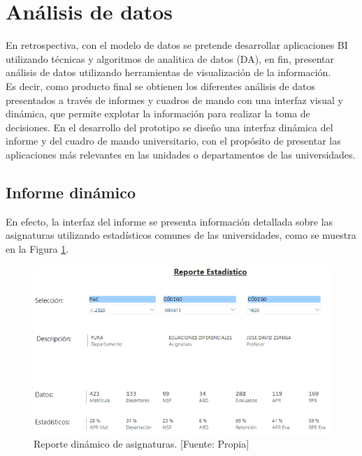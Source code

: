 \documentclass[11pt,titlepage]{report}
\begin{document}

\section{Análisis de datos}
En retrospectiva, con el modelo de datos se pretende desarrollar aplicaciones BI utilizando técnicas y algoritmos de analitica de datos (DA), en fin, presentar análisis de datos utilizando herramientas de visualización de la información.\\

Es decir, como producto final se obtienen los diferentes análisis de datos presentados a través de informes y cuadros de mando con una interfaz visual y dinámica, que permite explotar la información para realizar la toma de decisiones. 
En el desarrollo del prototipo se diseño una interfaz dinámica del informe y del cuadro de mando universitario, con el propósito de presentar las aplicaciones más relevantes en las unidades o departamentos de las universidades.

\subsection{Informe dinámico}
En efecto, la interfaz del informe se presenta información detallada sobre las asignaturas utilizando estadísticos comunes de las universidades, como se muestra en la Figura \ref{fig: ReporteE}.

\begin{figure}[h]
	\centering
	\includegraphics[width=1\linewidth]{Figuras/ReporteE}
	\caption{Reporte dinámico de asignaturas. [Fuente: Propia]}
	\label{fig: ReporteE}
\end{figure}
\end{document}
